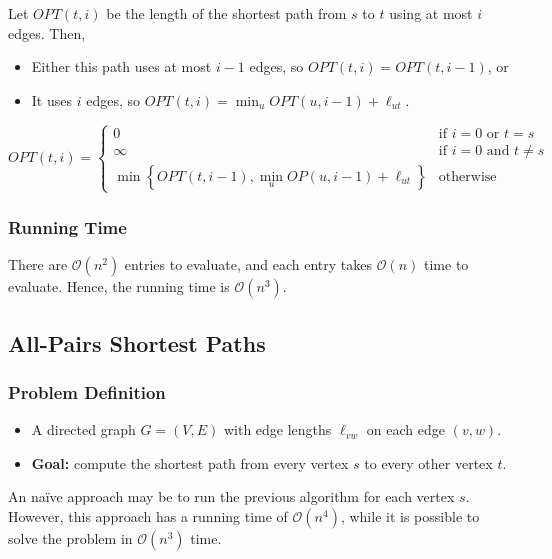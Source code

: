 Let $OPT(t, i)$ be the length of the shortest path from $s$ to $t$ using at most $i$ edges. Then,
\begin{itemize}
    \item Either this path uses at most $i - 1$ edges, so $OPT(t, i) = OPT(t, i - 1)$, or
    \item It uses $i$ edges, so $\displaystyle OPT(t, i) = \min_{u} OPT(u, i - 1) + \ell_{ut}$.
\end{itemize} \[
    OPT(t, i) = \begin{cases} 
        0                                                                     & \text{if } i = 0 \text{ or } t = s    \\
        \infty                                                                & \text{if } i = 0 \text{ and } t \ne s \\
        \displaystyle
        \min\left\{ OPT(t, i - 1), \min_{u} OP(u, i - 1) + \ell_{ut} \right\} & \text{otherwise}
    \end{cases}
\]

\subsubsection{Running Time}

There are $\mathcal{O}(n^2)$ entries to evaluate, and each entry takes $\mathcal{O}(n)$ time to evaluate. Hence, the running time is $\mathcal{O}(n^3)$.

\subsection{All-Pairs Shortest Paths}

\subsubsection{Problem Definition}

\begin{itemize}
    \item A directed graph $G = (V, E)$ with edge lengths $\ell_{vw}$ on each edge $(v, w)$.
    \item \textbf{Goal:} compute the shortest path from every vertex $s$ to every other vertex $t$.
\end{itemize}

An na\"ive approach may be to run the previous algorithm for each vertex $s$. However, this approach has a running time of $\mathcal{O}(n^4)$, while it is possible to solve the problem in $\mathcal{O}(n^3)$ time.

